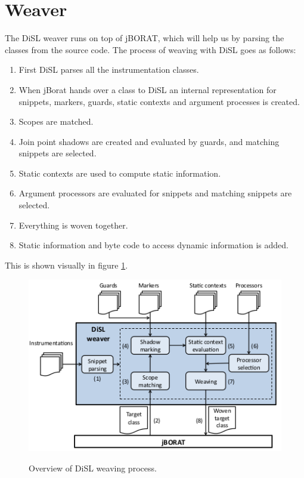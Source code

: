 \documentclass[a4paper]{report}
\begin{document}
\section{Weaver}
The DiSL weaver runs on top of jBORAT, which will help us by parsing the classes from the source code. The process of weaving with DiSL goes as follows:
\begin{enumerate}
\item First DiSL parses all the instrumentation classes.
\item When jBorat hands over a class to DiSL an internal representation for snippets, markers, guards, static contexts and argument processes is created.
\item Scopes are matched.
\item Join point shadows are created and evaluated by guards, and matching snippets are selected.
\item Static contexts are used to compute static information.
\item Argument processors are evaluated for snippets and matching snippets are selected.
\item Everything is woven together.
\item Static information and byte code to access dynamic information is added.
\end{enumerate}
This is shown visually in figure \ref{fig:DiSL_Weaver}.\\
\begin{figure}[h!]
\centering
\includegraphics[scale=0.5]{images/Languages/DiSL_Weaver.png}\\
\caption{Overview of DiSL weaving process.\citep{marek_disl:_2012}}
\label{fig:DiSL_Weaver}
\end{figure}
\end{document}
